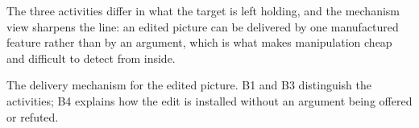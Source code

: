 

\begin{distilled}
  \item The three activities differ in what the target is left holding, and the mechanism view sharpens the line: an edited picture can be delivered by one manufactured feature rather than by an argument, which is what makes manipulation cheap and difficult to detect from inside.
\end{distilled}

\begin{unique}
  \item The delivery mechanism for the edited picture. B1 and B3 distinguish the activities; B4 explains how the edit is installed without an argument being offered or refuted.
\end{unique}
